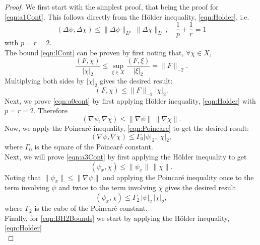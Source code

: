 \begin{proof}
  We first start with the simplest proof, that being the proof for
  \eqref{eqn:a1Cont}. This follows directly from the H\"older inequality, \eqref{eqn:Holder}, i.e.
  \begin{equation*}
    (\Delta \psi, \Delta \chi) \le \|\Delta \psi\|_{L^p}\,\|\Delta \chi\|_{L^r},
    \quad \frac{1}{p} + \frac{1}{r} = 1
  \end{equation*}
  with $p=r=2$. \\
  The bound \eqref{eqn:lCont} can be proven by first noting that, $\forall \chi
  \in X$,
  \begin{equation*}
    \frac{(F,\chi)}{|\chi|_2} \le \sup_{\xi \in X} \frac{(F,\xi)}{|\xi|_2} =
      \|F\|_{-2}.
  \end{equation*}
  Multiplying both sides by $|\chi|_2$ gives the desired result:
  \begin{equation*}
    (F,\chi) \le \|F\|_{-2}|\chi|_2.
  \end{equation*}
  Next, we prove \eqref{eqn:a0cont} by first applying H\"older inequality, \eqref{eqn:Holder} with
  $p=r=2$. Therefore
  \begin{equation*}
    (\nabla \psi, \nabla \chi) \le \|\nabla \psi\|\, \|\nabla \chi\|.
  \end{equation*}
  Now, we apply the Poincar\'e inequality, \eqref{eqn:Poincare} to get the
  desired result:
  \begin{equation*}
    (\nabla \psi, \nabla \chi) \le \Gamma_0 |\psi|_2, |\chi|_2,
  \end{equation*}
  where $\Gamma_0$ is the square of the Poincar\'e constant. \\
  Next, we will prove \eqref{eqn:a3Cont} by first applying the H\"older
  inequality to get
  \begin{equation*}
    (\psi_x, \chi) \le \|\psi_x\|\, \|\chi\|.
  \end{equation*}
  Noting that $\|\psi_x\| \le \|\nabla \psi\|$ and applying the Poincar\'e
  inequality once to the term involving $\psi$ and twice to the term involving
  $\chi$ gives the desired result
  \begin{equation*}
    (\psi_x, \chi) \le \Gamma_2\,|\psi|_2\, |\chi|_2,
  \end{equation*}
  where $\Gamma_2$ is the cube of the Poincar\'e constant. \\
  Finally, for \eqref{eqn:BH2Bounds} we start by applying the H\"older inequality, \eqref{eqn:Holder}
  \begin{equation}

\end{equation}
\end{proof}
